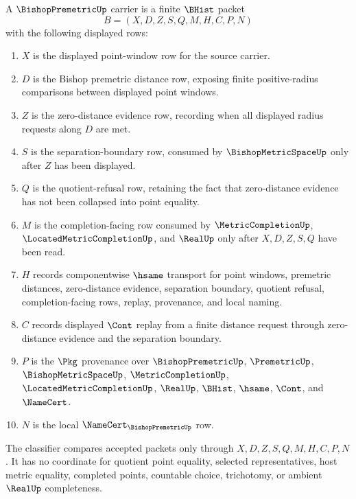 \begin{definition}
\label{def:bishop-premetric-carrier}
A $\BishopPremetricUp$ carrier is a finite $\BHist$ packet
$$
B=(X,D,Z,S,Q,M,H,C,P,N)
$$
with the following displayed rows:
\begin{enumerate}
\item $X$ is the displayed point-window row for the source carrier.
\item $D$ is the Bishop premetric distance row, exposing finite positive-radius comparisons between displayed point windows.
\item $Z$ is the zero-distance evidence row, recording when all displayed radius requests along $D$ are met.
\item $S$ is the separation-boundary row, consumed by $\BishopMetricSpaceUp$ only after $Z$ has been displayed.
\item $Q$ is the quotient-refusal row, retaining the fact that zero-distance evidence has not been collapsed into point equality.
\item $M$ is the completion-facing row consumed by $\MetricCompletionUp$, $\LocatedMetricCompletionUp$, and $\RealUp$ only after $X,D,Z,S,Q$ have been read.
\item $H$ records componentwise $\hsame$ transport for point windows, premetric distances, zero-distance evidence, separation boundary, quotient refusal, completion-facing rows, replay, provenance, and local naming.
\item $C$ records displayed $\Cont$ replay from a finite distance request through zero-distance evidence and the separation boundary.
\item $P$ is the $\Pkg$ provenance over $\BishopPremetricUp$, $\PremetricUp$, $\BishopMetricSpaceUp$, $\MetricCompletionUp$, $\LocatedMetricCompletionUp$, $\RealUp$, $\BHist$, $\hsame$, $\Cont$, and $\NameCert$.
\item $N$ is the local $\NameCert_{\BishopPremetricUp}$ row.
\end{enumerate}
The classifier compares accepted packets only through $X,D,Z,S,Q,M,H,C,P,N$. It has no coordinate for quotient point equality, selected representatives, host metric equality, completed points, countable choice, trichotomy, or ambient $\RealUp$ completeness.
\end{definition}

